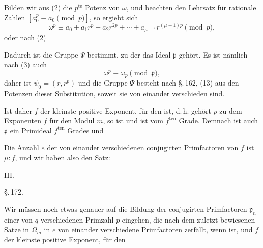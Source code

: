 Bilden wir aus (2) die $p^{\text{te}}$ Potenz von $\omega$, und beachten den
 Lehrsatz f\"ur rationale Zahlen $[a_0^p \equiv a_0 \pmod{p}]$,
so ergiebt sich
\[
\omega^p \equiv a_0 + a_1 r^p + a_2 r^{2p} + \cdots + a_{\mu-1} r^{(\mu-1)p} \pmod{p},
\]
oder nach (2)

Dadurch ist die Gruppe $\Psi$ bestimmt, zu der das Ideal $\mathfrak{p}$
geh\"ort. Es ist n\"amlich nach (3) auch
\[
\omega^p \equiv \omega_p \pmod{\mathfrak{p}},
\]
daher ist $\psi_0 = (r, r^p)$ und die Gruppe $\Psi$ besteht nach \S.\,162, (13)
aus den Potenzen dieser Substitution, soweit sie von einander
verschieden sind.

Ist daher $f$ der kleinste positive Exponent, f\"ur den
ist, d.\,h. geh\"ort $p$ zu dem Exponenten $f$ f\"ur den Modul $m$, so ist
und ist vom $f^{\text{ten}}$ Grade. Demnach ist auch $\mathfrak{p}$ ein Primideal
$f^{\text{ten}}$ Grades und

Die Anzahl $e$ der von einander verschiedenen conjugirten
Primfactoren von $f$ ist $\mu : f$, und wir haben also den Satz: %

III. 

\begin{center}
\S.\,172.

\end{center}

Wir m\"ussen noch etwas genauer auf die Bildung der conjugirten Primfactoren $\mathfrak{p}_n$ einer von $q$ verschiedenen Primzahl $p$
eingehen, die nach dem zuletzt bewiesenen Satze in $\Omega_m$ in $e$
von einander verschiedene Primfactoren zerf\"allt, wenn
ist, und $f$ der kleinste positive Exponent, f\"ur den
